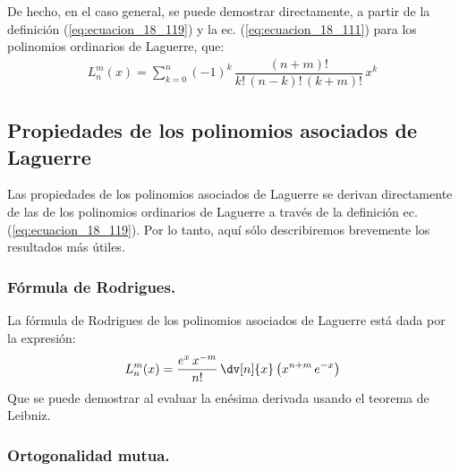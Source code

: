 De hecho, en el caso general, se puede demostrar directamente, a partir de la definición (\ref{eq:ecuacion_18_119}) y la ec. (\ref{eq:ecuacion_18_111}) para los polinomios ordinarios de Laguerre, que:
\begin{align}
L_{n}^{m} (x) = \sum_{k=0}^{n} (-1)^{k} \, \dfrac{(n + m)!}{k! \, (n - k)! \, (k + m)!} \, x^{k}
\label{eq:ecuacion_18_120}
\end{align}

\subsection{Propiedades de los polinomios asociados de Laguerre}

Las propiedades de los polinomios asociados de Laguerre se derivan directamente de las de los polinomios ordinarios de Laguerre a través de la definición ec. (\ref{eq:ecuacion_18_119}). Por lo tanto, aquí sólo describiremos brevemente los resultados más útiles.

\subsubsection{Fórmula de Rodrigues.}

La fórmula de Rodrigues de los polinomios asociados de Laguerre está dada por la expresión:
\begin{align}
L_{n}^{m} (x) = \dfrac{e^{x} \, x^{-m}}{n!} \, \dv[n]{x} \left( x^{n+m} \, e^{-x} \right)
\label{eq:ecuacion_18_121}
\end{align}
Que se puede demostrar al evaluar la enésima derivada usando el teorema de Leibniz.

\subsubsection{Ortogonalidad mutua.}

